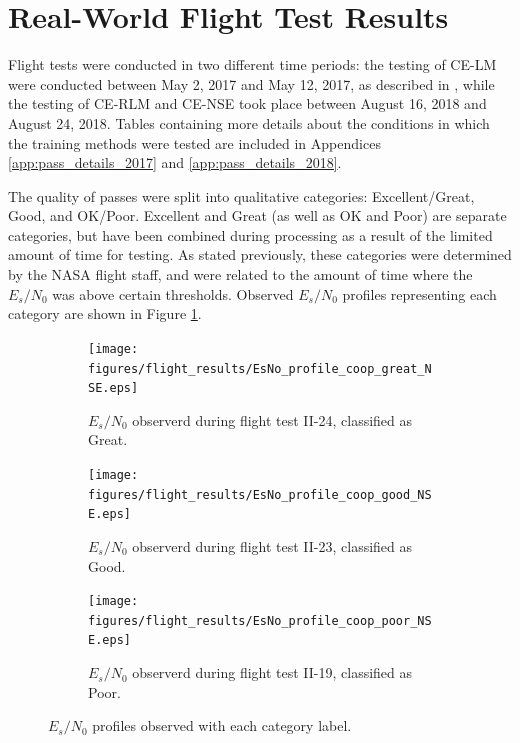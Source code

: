 \section{Real-World Flight Test Results}
\par Flight tests were conducted in two different time periods: the testing of CE-LM were conducted between May 2, 2017 and May 12, 2017, as described in \cite{tim_implementation_paper}, while the testing of CE-RLM and CE-NSE took place between August 16, 2018 and August 24, 2018. Tables containing more details about the conditions in which the training methods were tested are included in Appendices \ref{app:pass_details_2017} and \ref{app:pass_details_2018}. 
\par The quality of passes were split into qualitative categories: Excellent/Great, Good, and OK/Poor. Excellent and Great (as well as OK and Poor) are separate categories, but have been combined during processing as a result of the limited amount of time for testing. As stated previously, these categories were determined by the NASA flight staff, and were related to the amount of time where the $E_s/N_0$ was above certain thresholds. Observed $E_s/N_0$ profiles representing each category are shown in Figure \ref{fig:snrProfileVarieties_flight}.
\begin{figure}[ht!]
\centering
\begin{subfigure}{\linewidth}
\centering
\texttt{[image: figures/flight\_results/EsNo\_profile\_coop\_great\_NSE.eps]}
\caption{$E_s/N_0$ observerd during flight test II-24, classified as Great.}
\end{subfigure}
\begin{subfigure}{\linewidth}
\centering
\texttt{[image: figures/flight\_results/EsNo\_profile\_coop\_good\_NSE.eps]}
\caption{$E_s/N_0$ observerd during flight test II-23, classified as Good.}
\end{subfigure}
\begin{subfigure}{\linewidth}
\centering
\texttt{[image: figures/flight\_results/EsNo\_profile\_coop\_poor\_NSE.eps]}
\caption{$E_s/N_0$ observerd during flight test II-19, classified as Poor.}
\end{subfigure}

\caption{$E_s/N_0$ profiles observed with each category label.} \label{fig:snrProfileVarieties_flight}
\end{figure} 

\clearpage

